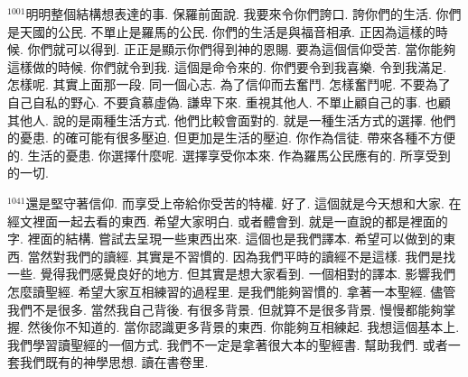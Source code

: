 \documentclass{book}
\begin{document}
$^{1001}$明明整個結構想表達的事.
保羅前面說.
我要來令你們誇口.
誇你們的生活.
你們是天國的公民.
不單止是羅馬的公民.
你們的生活是與福音相承.
正因為這樣的時候.
你們就可以得到.
正正是顯示你們得到神的恩賜.
要為這個信仰受苦.
當你能夠這樣做的時候.
你們就令到我.
這個是命令來的.
你們要令到我喜樂.
令到我滿足.
怎樣呢.
其實上面那一段.
同一個心志.
為了信仰而去奮鬥.
怎樣奮鬥呢.
不要為了自己自私的野心.
不要貪慕虛偽.
謙卑下來.
重視其他人.
不單止顧自己的事.
也顧其他人.
說的是兩種生活方式.
他們比較會面對的.
就是一種生活方式的選擇.
他們的憂患.
的確可能有很多壓迫.
但更加是生活的壓迫.
你作為信徒.
帶來各種不方便的.
生活的憂患.
你選擇什麼呢.
選擇享受你本來.
作為羅馬公民應有的.
所享受到的一切.

$^{1041}$還是堅守著信仰.
而享受上帝給你受苦的特權.
好了.
這個就是今天想和大家.
在經文裡面一起去看的東西.
希望大家明白.
或者體會到.
就是一直說的都是裡面的字.
裡面的結構.
嘗試去呈現一些東西出來.
這個也是我們譯本.
希望可以做到的東西.
當然對我們的讀經.
其實是不習慣的.
因為我們平時的讀經不是這樣.
我們是找一些.
覺得我們感覺良好的地方.
但其實是想大家看到.
一個相對的譯本.
影響我們怎麼讀聖經.
希望大家互相練習的過程里.
是我們能夠習慣的.
拿著一本聖經.
儘管我們不是很多.
當然我自己背後.
有很多背景.
但就算不是很多背景.
慢慢都能夠掌握.
然後你不知道的.
當你認識更多背景的東西.
你能夠互相練起.
我想這個基本上.
我們學習讀聖經的一個方式.
我們不一定是拿著很大本的聖經書.
幫助我們.
或者一套我們既有的神學思想.
讀在書卷里.
\newpage
\end{document}
